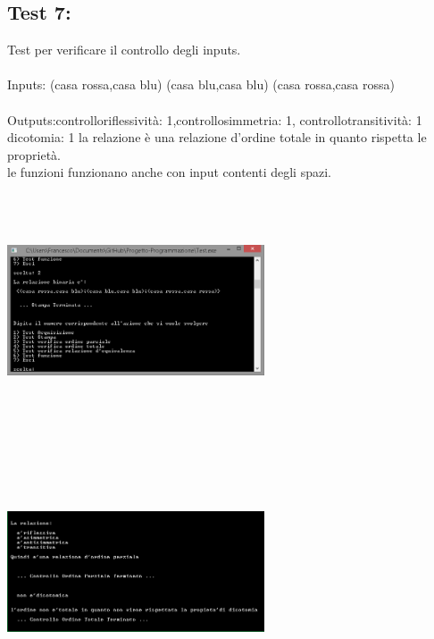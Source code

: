 \documentclass[11pt, a4paper, titlepage, block]{article}
\begin{document}
	\subsection{Test 7:}
	Test per verificare il controllo degli inputs.\\
	\\
	Inputs: (casa rossa,casa blu)  (casa blu,casa blu)  (casa rossa,casa rossa) \\
	\\
	Outputs:controllo\textunderscore riflessivit\`a:  1,controllo\textunderscore simmetria:  1, controllo\textunderscore transitivit\`a:  1 dicotomia: 1
	la relazione \`e una relazione d'ordine totale in quanto rispetta le propriet\`a.\\
	le funzioni funzionano anche con input contenti degli spazi.\\
	\includegraphics[width=3in,height=3in,viewport=0 0 300 300]{../Screenshots/Test7Input.png}
	\\
	\includegraphics[width=3in,height=3in,viewport=0 0 300 300]{../Screenshots/Test7Output.png}
	\\
	\\
	\newpage
\end{document}
